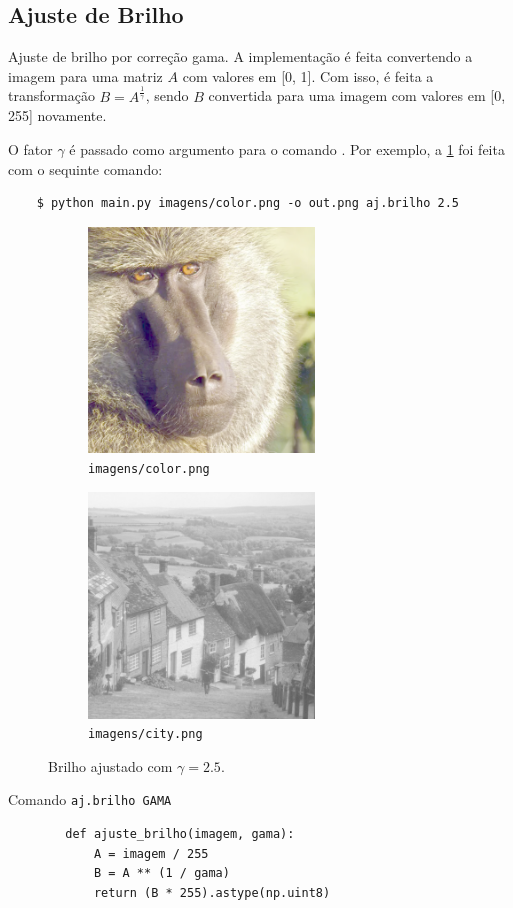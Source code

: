 \subsection{Ajuste de Brilho}

Ajuste de brilho por correção gama. A implementação é feita convertendo a imagem para uma matriz $A$ com valores em [0, 1]. Com isso, é feita a transformação $B = A^{\frac{1}{\gamma}}$,
sendo $B$ convertida para uma imagem com valores em [0, 255] novamente.

O fator $\gamma$ é passado como argumento para o comando . Por exemplo, a \cref{fig:ajbrilho} foi feita com o sequinte comando:

\begin{verbatim}
    $ python main.py imagens/color.png -o out.png aj.brilho 2.5
\end{verbatim}

\begin{figure}[H]
    \centering
    \begin{subfigure}{0.45\textwidth}
        \centering
        \includegraphics[width=6cm]{resultados/colorgama.png}
        \caption{\texttt{imagens/color.png}}
        \label{fig:ajbrilho}
    \end{subfigure}%
    \begin{subfigure}{0.45\textwidth}
        \centering
        \includegraphics[width=6cm]{resultados/citygama.png}
        \caption{\texttt{imagens/city.png}}
    \end{subfigure}

    \caption{Brilho ajustado com $\gamma = 2.5$.}
\end{figure}

\begin{listing}[H]
    \caption{Comando \texttt{aj.brilho GAMA}}

    \begin{verbatim}
        def ajuste_brilho(imagem, gama):
            A = imagem / 255
            B = A ** (1 / gama)
            return (B * 255).astype(np.uint8)
    \end{verbatim}
\end{listing}
